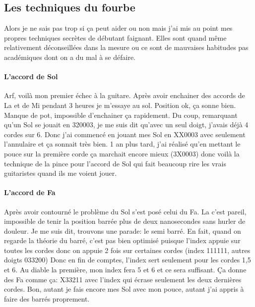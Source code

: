 \documentclass[a4paper,twoside]{article}
\begin{document}
\subsection{Les techniques du fourbe}

Alors je ne sais pas trop si ça peut aider ou non mais j'ai mis au
point mes propres techniques secrètes de débutant faignant. Elles sont
quand même relativement déconseillées dans la mesure ou ce sont de
mauvaises habitudes pas académiques dont on a du mal à se défaire.

\paragraph{L'accord de Sol}
Arf, voilà mon premier échec à la guitare. Après avoir enchainer des
accords de La et de Mi pendant 3 heures je m'essaye au sol. Position
ok, ça sonne bien. Manque de pot, impossible d'enchainer ça
rapidement.  Du coup, remarquant qu'un Sol se jouait en 320003, je me
suis dit qu'avec un seul doigt, j'avais déjà 4 cordes sur 6. Donc j'ai
commencé en jouant mes Sol en XX0003 avec seulement l'annulaire et ça
sonnait très bien. 1 an plus tard, j'ai réalisé qu'en mettant le pouce
sur la première corde ça marchait encore mieux (3X0003) donc voilà la
technique de la pince pour l'accord de Sol qui fait beaucoup rire les
vrais guitaristes quand ils me voient jouer.

\paragraph{L'accord de Fa}
Après avoir contourné le problème du Sol s'est posé celui du Fa. La
c'est pareil, impossible de tenir la position barrée plus de deux
nanosecondes sans hurler de douleur.  Je me suis dit, trouvons une parade:
le semi barré.  En fait, quand on regarde la théorie du barré, c'est
pas bien optimisé puisque l'index appuie sur toutes les cordes donc on
appuie 2 fois sur certaines cordes (index 111111, autres doigts 033200)
Donc en fin de comptes, l'index sert seulement pour les cordes 1,5 et
6. Au diable la première, mon index fera 5 et 6 et ce sera suffisant.
Ça donne des Fa comme ça: X33211 avec l'index qui écrase seulement les
deux dernières cordes. Bon, autant je fais encore mes Sol avec mon
pouce, autant j'ai appris à faire des barrés proprement.
\end{document}
